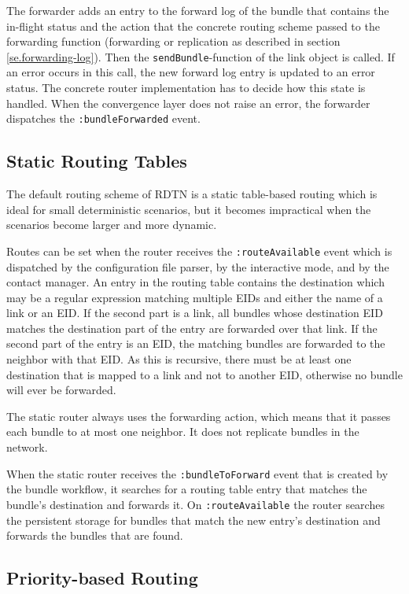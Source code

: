 \documentclass[a4paper]{article}
\begin{document}
The forwarder adds an entry to the forward log of the bundle that contains the
in-flight status and the action that the concrete routing scheme passed to
the forwarding function (forwarding or replication as described in section
\ref{se.forwarding-log}). Then the {\tt sendBundle}-function of the link object
is called. If an error occurs in this call, the new forward log entry is updated
to an error status. The concrete router implementation has to decide how this
state is handled. When the convergence layer does not raise an error, the
forwarder dispatches the {\tt :bundleForwarded} event.

\subsection{Static Routing Tables}\label{sec.static-routing}

The default routing scheme of RDTN is a static table-based routing which is
ideal for small deterministic scenarios, but it becomes impractical when the
scenarios become larger and more dynamic.

Routes can be set when the router receives the {\tt :routeAvailable} event which
is dispatched by the configuration file parser, by the interactive mode, and by
the contact manager.  An entry in the routing table contains the destination
which may be a regular expression matching multiple EIDs and either the name of
a link or an EID. If the second part is a link, all bundles whose destination
EID matches the destination part of the entry are forwarded over that link. If
the second part of the entry is an EID, the matching bundles are forwarded to
the neighbor with that EID. As this is recursive, there must be at least one
destination that is mapped to a link and not to another EID, otherwise no bundle
will ever be forwarded.

The static router always uses the forwarding action, which means that it
passes each bundle to at most one neighbor. It does not replicate bundles in the
network.

When the static router receives the {\tt :bundleToForward} event that is created
by the bundle workflow, it searches for a routing table entry that matches the
bundle's destination and forwards it.  On {\tt :routeAvailable} the router
searches the persistent storage for bundles that match the new entry's
destination and forwards the bundles that are found.

\subsection{Priority-based Routing}\label{sec.prio-routing}
\end{document}
